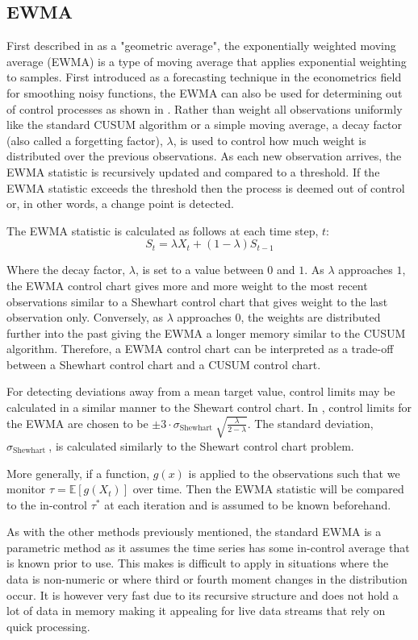 \subsection{EWMA}
First described in \cite{roberts1959control} as a "geometric average", the exponentially weighted moving average (EWMA) is a type of moving average that applies exponential weighting to samples. First introduced as a forecasting technique in the econometrics field for smoothing noisy functions, the EWMA can also be used for determining out of control processes as shown in \cite{hunter1986exponentially}. Rather than weight all observations uniformly like the standard CUSUM algorithm or a simple moving average, a decay factor (also called a  forgetting factor), $\lambda$, is used to control how much weight is distributed over the previous observations. As each new observation arrives, the EWMA statistic is recursively updated and compared to a threshold. If the EWMA statistic exceeds the threshold then the process is deemed out of control or, in other words, a change point is detected.

The EWMA statistic is calculated as follows at each time step, $t$:
$$S_t = \lambda X_t + (1-\lambda)S_{t-1} $$

Where the decay factor,  $\lambda$, is set to a value between $0$ and $1$. As $\lambda$ approaches $1$, the EWMA control chart gives more and more weight to the most recent observations similar to a Shewhart control chart that gives weight to the last observation only. Conversely, as $\lambda$ approaches $0$, the weights are distributed further into the past giving the EWMA a longer memory similar to the CUSUM algorithm. Therefore, a EWMA control chart can be interpreted as a trade-off between a Shewhart control chart and a CUSUM control chart. 

For detecting deviations away from a mean target value, control limits may be calculated in a similar manner to the Shewart control chart. In \cite{hunter1986exponentially}, control limits for the EWMA are chosen to be  $\pm 3 \cdot \sigma_{\text {Shewhart }} \sqrt{\frac{\lambda}{2-\lambda}}$. The standard deviation, $\sigma_{\text {Shewhart }}$, is calculated similarly to the Shewart control chart problem. %

More generally, if a function, $g(x)$ is applied to the observations such that we monitor $\tau= \mathbb{E}[g(X_t)]$ over time. Then the EWMA statistic will be compared to the in-control $\tau^*$ at each iteration and is assumed to be known beforehand.  

As with the other methods previously mentioned, the standard EWMA is a parametric method as it assumes the time series has some in-control average that is known prior to use. This makes is difficult to apply in situations where the data is non-numeric or where third or fourth moment changes in the distribution occur. It is however very fast due to its recursive structure and does not hold a lot of data in memory making it appealing for live data streams that rely on quick processing.